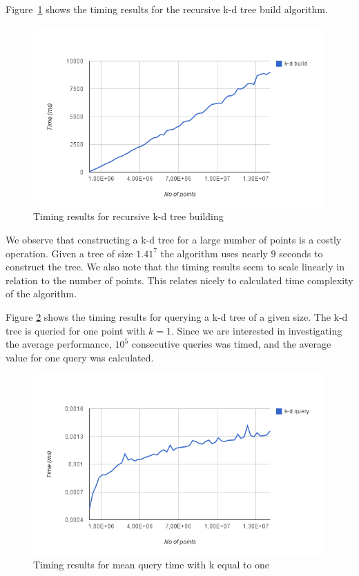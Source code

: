 Figure~\ref{fig:serial-build} shows the timing results for the recursive k-d tree build algorithm.

\begin{figure}[ht!]
    \centering
    \includegraphics[width=120mm]{../gfx/serial-build.png}
    \caption{Timing results for recursive k-d tree building}
    \label{fig:serial-build}
\end{figure}

We observe that constructing a k-d tree for a large number of points is a costly operation. Given a tree of size $1.41^7$ the algorithm uses nearly $9$ seconds to construct the tree. We also note that the timing results seem to scale linearly in relation to the number of points. This relates nicely to calculated time complexity of the algorithm.

Figure \ref{fig:serial-query} shows the timing results for querying a k-d tree of a given size. The k-d tree is queried for one point with $k=1$. Since we are interested in investigating the average performance, $10^5$ consecutive queries was timed, and the average value for one query was calculated.

\begin{figure}[ht!]
    \centering
    \includegraphics[width=120mm]{../gfx/serial-query.png}
    \caption{Timing results for mean query time with k equal to one}
    \label{fig:serial-query}
\end{figure}

